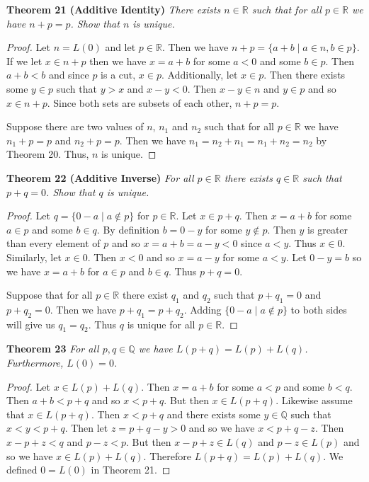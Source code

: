 \documentclass{article}
\begin{document}
\begin{flushleft}
\textbf{Theorem 21 (Additive Identity)}
\textsl{There exists $n \in \mathbb{R}$ such that for all $p \in \mathbb{R}$ we have $n+p=p$. Show that $n$ is unique.}
\begin{proof}
Let $n=L(0)$ and let $p \in \mathbb{R}$. Then we have $n+p=\{a+b \mid a \in n, b \in p\}$. If we let $x \in n+p$ then we have $x = a+b$ for some $a < 0$ and some $b \in p$. Then $a+b<b$ and since $p$ is a cut, $x \in p$. Additionally, let $x \in p$. Then there exists some $y \in p$ such that $y > x$ and $x-y < 0$. Then $x-y \in n$ and $y \in p$ and so $x \in n+p$. Since both sets are subsets of each other, $n+p=p$.\newline

Suppose there are two values of $n$, $n_1$ and $n_2$ such that for all $p \in \mathbb{R}$ we have $n_1+p=p$ and $n_2+p=p$. Then we have $n_1=n_2+n_1=n_1+n_2=n_2$ by Theorem 20. Thus, $n$ is unique.
\end{proof}

\textbf{Theorem 22 (Additive Inverse)}
\textsl{For all $p \in \mathbb{R}$ there exists $q \in \mathbb{R}$ such that $p+q=0$. Show that $q$ is unique.}
\begin{proof}
Let $q=\{0-a \mid a \notin p\}$ for $p \in \mathbb{R}$. Let $x \in p+q$. Then $x=a+b$ for some $a \in p$ and some $b \in q$. By definition $b=0-y$ for some $y \notin p$. Then $y$ is greater than every element of $p$ and so $x=a+b=a-y<0$ since $a<y$. Thus $x \in 0$. Similarly, let $x \in 0$. Then $x<0$ and so $x=a-y$ for some $a<y$. Let $0-y=b$ so we have $x=a+b$ for $a \in p$ and $b \in q$. Thus $p+q=0$.\newline

Suppose that for all $p \in \mathbb{R}$ there exist $q_1$ and $q_2$ such that $p+q_1=0$ and $p+q_2=0$. Then we have $p+q_1=p+q_2$. Adding $\{0-a \mid a \notin p\}$ to both sides will give us $q_1=q_2$. Thus $q$ is unique for all $p \in \mathbb{R}$.
\end{proof}

\textbf{Theorem 23}
\textsl{For all $p,q \in \mathbb{Q}$ we have $L(p+q)=L(p)+L(q)$. Furthermore, $L(0)=0$.}
\begin{proof}
Let $x \in L(p)+L(q)$. Then $x=a+b$ for some $a < p$ and some $b < q$. Then $a+b < p+q$ and so $x<p+q$. But then $x \in L(p+q)$. Likewise assume that $x \in L(p+q)$. Then $x<p+q$ and there exists some $y \in \mathbb{Q}$ such that $x<y<p+q$. Then let $z = p+q-y>0$ and so we have $x<p+q-z$. Then $x-p+z<q$ and $p-z<p$. But then $x-p+z \in L(q)$ and $p-z \in L(p)$ and so we have $x \in L(p) + L(q)$. Therefore $L(p+q) = L(p) + L(q)$. We defined $0=L(0)$ in Theorem 21.
\end{proof}


\end{flushleft}
\end{document}
